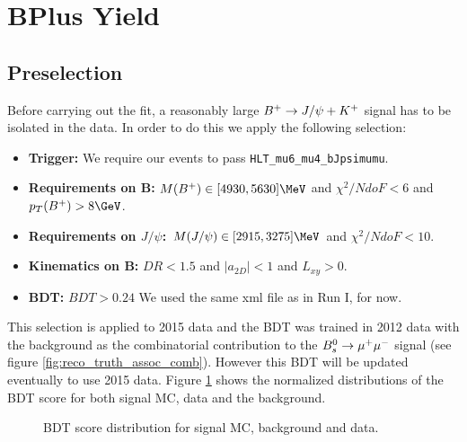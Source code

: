 \graphicspath{ {figures/InternalNote_BPlusYield/} }

\section{BPlus Yield}
\label{sec:BPlusYield}

\subsection{Preselection}
Before carrying out the fit, a reasonably large $B^{+}\rightarrow J/\psi+K^{+}$ signal has to be isolated
in the data. In order to do this we apply the following selection:

\begin{itemize}
    \item \textbf{Trigger: } We require our events to pass \verb|HLT_mu6_mu4_bJpsimumu|.
    \item \textbf{Requirements on B: } $M(B^+)\in [4930, 5630]\MeV$ and $\chi^2/NdoF < 6$ and $p_{T}(B^+)>8\GeV$.
    \item \textbf{Requirements on $J/\psi$: } $M(J/\psi)\in [2915, 3275]\MeV$ and $\chi^2/NdoF < 10$.
    \item \textbf{Kinematics on B: } $DR<1.5$ and $|a_{2D}|<1$ and $L_{xy}>0$.
    \item \textbf{BDT: } $BDT > 0.24$ We used the same xml file as in Run I, for now.
\end{itemize}

This selection is applied to 2015 data and the BDT was trained in 2012 data with the 
background as the combinatorial contribution to the $B_{s}^{0}\rightarrow \mu^{+}\mu^{-}$ signal (see figure \ref{fig:reco_truth_assoc_comb}).
However this BDT will be updated eventually to use 2015 data. Figure \ref{fig:bplus_bdt_score} shows
the normalized distributions of the BDT score for both signal MC, data and the background.

\begin{figure}[ht]
    \centering
    \caption{BDT score distribution for signal MC, background and data.}
    \label{fig:bplus_bdt_score}
\end{figure}

